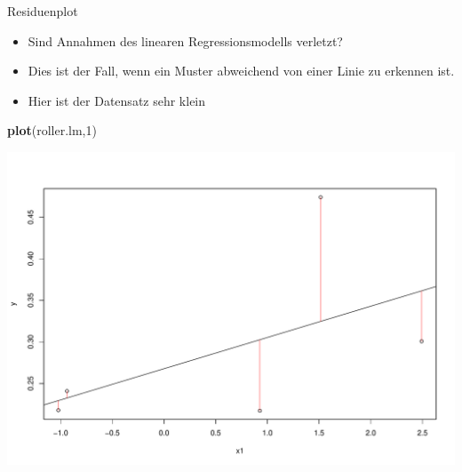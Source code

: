 \documentclass[ignorenonframetext,]{beamer}
\newenvironment{Shaded}{}{}
\newcommand{\KeywordTok}[1]{\textcolor[rgb]{0.00,0.44,0.13}{\textbf{{#1}}}}
\newcommand{\DecValTok}[1]{\textcolor[rgb]{0.25,0.63,0.44}{{#1}}}
\newcommand{\NormalTok}[1]{{#1}}
\providecommand{\tightlist}{%
\setlength{\itemsep}{0pt}\setlength{\parskip}{0pt}}
\begin{document}
\begin{frame}[fragile]{Residuenplot}

\begin{itemize}
\tightlist
\item
  Sind Annahmen des linearen Regressionsmodells verletzt?
\item
  Dies ist der Fall, wenn ein Muster abweichend von einer Linie zu
  erkennen ist.
\item
  Hier ist der Datensatz sehr klein
\end{itemize}

\begin{Shaded}
\begin{Highlighting}[]
\KeywordTok{plot}\NormalTok{(roller.lm,}\DecValTok{1}\NormalTok{)}
\end{Highlighting}
\end{Shaded}

\includegraphics{R_intern_files/figure-beamer/unnamed-chunk-300-1.pdf}

\end{frame}
\end{document}
